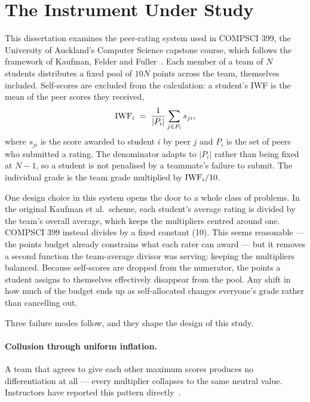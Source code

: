 \section{The Instrument Under Study}
\label{sec:iwf-vulns}

This dissertation examines the peer-rating system used in COMPSCI 399, the University of Auckland's Computer Science capstone course, which follows the framework of Kaufman, Felder and Fuller~\citep{kaufman2000accounting}. Each member of a team
of $N$ students distributes a fixed pool of $10N$ points across the team,
themselves included. Self-scores are excluded from the calculation: a student's
IWF is the mean of the peer scores they received,
\begin{equation}
  \mathrm{IWF}_i \;=\; \frac{1}{|P_i|}\sum_{j \in P_i} s_{ji},
  \label{eq:iwf}
\end{equation}
where $s_{ji}$ is the score awarded to student $i$ by peer $j$ and $P_i$ is the
set of peers who submitted a rating. The denominator adapts to $|P_i|$ rather
than being fixed at $N-1$, so a student is not penalised by a teammate's failure
to submit. The individual grade is the team grade multiplied by $\mathrm{IWF}_i / 10$.

One design choice in this system opens the door to a whole class of problems. In the original Kaufman et al.\ scheme, each student's average rating is divided by the team's overall average, which keeps the multipliers centred around one. COMPSCI 399 instead divides by a fixed constant (10). This seems reasonable — the points budget already constrains what each rater can award — but it removes a second function the team-average divisor was serving: keeping the multipliers balanced. Because self-scores are dropped from the numerator, the points a student assigns to themselves effectively disappear from the pool. Any shift in how much of the budget ends up as self-allocated changes everyone's grade rather than cancelling out.

Three failure modes follow, and they shape the design of this study.

\paragraph{Collusion through uniform inflation.} A team that agrees to give each other maximum scores produces no differentiation at all — every multiplier collapses to the same neutral value. Instructors have reported this pattern directly~\citep{hooshangi2025assessment}.


